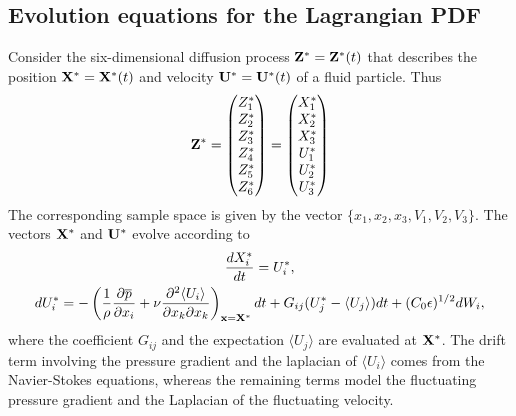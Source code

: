\documentclass[oneside,a4paper,11pt]{report}
\newcommand{\pavg}{\overline{p}}
\newcommand{\uiavg}{\langle U_i \rangle}
\newcommand{\ujavg}{\langle U_j \rangle}
\begin{document}
\subsection{Evolution equations for the Lagrangian PDF}

Consider the six-dimensional diffusion process $\mathbf{Z}^* = \mathbf{Z}^*(t)$  that describes the position $\mathbf{X}^* = \mathbf{X}^*(t)$ and velocity $\mathbf{U}^* = \mathbf{U}^*(t)$ of a fluid particle. Thus
\begin{equation}
\bold{Z}^* = \begin{pmatrix}
  Z_1^* \\
  Z_2^* \\
  Z_3^* \\
  Z_4^* \\
  Z_5^* \\
  Z_6^*
 \end{pmatrix}
=\begin{pmatrix}
  X_1^* \\
  X_2^* \\
  X_3^* \\
  U_1^* \\
  U_2^* \\
  U_3^*
 \end{pmatrix}
\end{equation}
The corresponding sample space is given by the vector $\{x_1, x_2, x_3, V_1, V_2, V_3\}$. The vectors $\mathbf{X}^*$ and $\mathbf{U}^*$ evolve according to
\begin{gather}
\frac{d X^*_i}{dt} = U^*_i, \\
dU_i^* = -\left ( \frac{1}{\rho} \frac{\partial \pavg}{\partial x_i} + \nu \frac{\partial^2 \uiavg}{\partial x_k \partial x_k} \right )_{\xvec = \Xvec^*} dt + G_{ij} (U_j^* - \ujavg) dt + (C_0 \epsilon)^{1/2} dW_i,
\end{gather} 
where the coefficient $G_{ij}$ and the expectation $\ujavg$ are evaluated at $\mathbf{X}^*$. The drift term involving the pressure gradient and the laplacian of $\uiavg$ comes from the Navier-Stokes equations, whereas the remaining terms model the fluctuating pressure gradient and the Laplacian of the fluctuating velocity.
\end{document}
